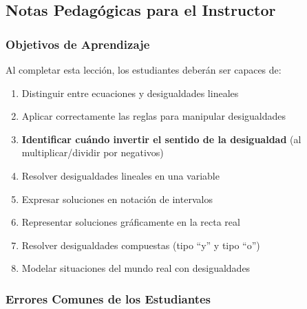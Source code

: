 
\subsection*{Notas Pedagógicas para el Instructor}

\subsubsection*{Objetivos de Aprendizaje}

Al completar esta lección, los estudiantes deberán ser capaces de:

\begin{enumerate}
    \item Distinguir entre ecuaciones y desigualdades lineales
    \item Aplicar correctamente las reglas para manipular desigualdades
    \item \textbf{Identificar cuándo invertir el sentido de la desigualdad} (al multiplicar/dividir por negativos)
    \item Resolver desigualdades lineales en una variable
    \item Expresar soluciones en notación de intervalos
    \item Representar soluciones gráficamente en la recta real
    \item Resolver desigualdades compuestas (tipo ``y'' y tipo ``o'')
    \item Modelar situaciones del mundo real con desigualdades
\end{enumerate}

\subsubsection*{Errores Comunes de los Estudiantes}

